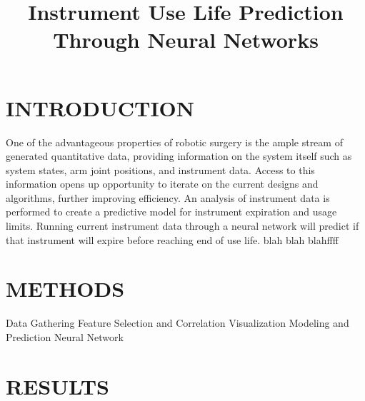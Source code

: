\documentclass{article}
\title{Instrument Use Life Prediction Through Neural Networks}
\begin{document}
\maketitle
\section{INTRODUCTION}
One of the advantageous properties of robotic surgery is the ample stream of generated quantitative data, providing information on the system itself such as system states, arm joint positions, and instrument data. Access to this information opens up opportunity to iterate on the current designs and algorithms, further improving efficiency. An analysis of instrument data is performed to create a predictive model for instrument expiration and usage limits. Running current instrument data through a neural network will predict if that instrument will expire before reaching end of use life.
blah blah blahffff
\section{METHODS}
Data Gathering
Feature Selection and Correlation Visualization
Modeling and Prediction
Neural Network
\section{RESULTS}
\end{document}

